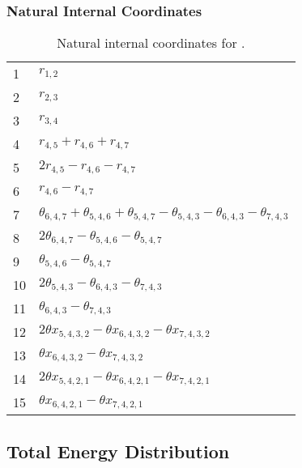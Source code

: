 \documentclass[10pt,oneside]{article}
\begin{document}
\begin{table}[h!]
\subsubsection*{Natural Internal Coordinates}
\centering
\caption{Natural internal coordinates for .}
\small
\begin{tabular}{ll}
\toprule
  1   & $r_{1,2}$ \\
  2   & $r_{2,3}$ \\
  3   & $r_{3,4}$ \\
  4   & $r_{4,5} + r_{4,6} + r_{4,7}$ \\
  5   & $2r_{4,5} - r_{4,6} - r_{4,7}$ \\
  6   & $r_{4,6} - r_{4,7}$ \\
  7   & $\theta_{6,4,7} + \theta_{5,4,6} + \theta_{5,4,7} - \theta_{5,4,3} - \theta_{6,4,3} - \theta_{7,4,3}$ \\
  8   & $2\theta_{6,4,7} - \theta_{5,4,6} - \theta_{5,4,7}$ \\
  9   & $\theta_{5,4,6} - \theta_{5,4,7}$ \\
  10  & $2\theta_{5,4,3} - \theta_{6,4,3} - \theta_{7,4,3}$ \\
  11  & $\theta_{6,4,3} - \theta_{7,4,3}$ \\
  12  & $2\theta x_{5,4,3,2} - \theta x_{6,4,3,2} - \theta x_{7,4,3,2}$ \\
  13  & $\theta x_{6,4,3,2} - \theta x_{7,4,3,2}$ \\
  14  & $2\theta x_{5,4,2,1} - \theta x_{6,4,2,1} - \theta x_{7,4,2,1}$ \\
  15  & $\theta x_{6,4,2,1} - \theta x_{7,4,2,1}$ \\
\bottomrule
\end{tabular}
\end{table}

\begin{table}
\subsection*{Total Energy Distribution}
\centering\end{table}

\clearpage

\subsection{}
\end{document}
